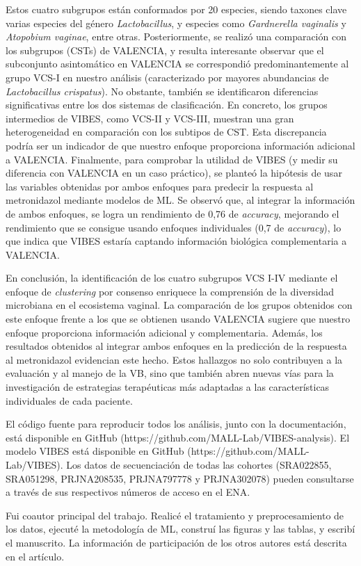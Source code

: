 Estos cuatro subgrupos están conformados por 20 especies, siendo taxones clave varias especies del género \textit{Lactobacillus}, y especies como \textit{Gardnerella vaginalis} y \textit{Atopobium vaginae}, entre otras. Posteriormente, se realizó una comparación con los subgrupos (CSTs) de VALENCIA, y resulta interesante observar que el subconjunto asintomático en VALENCIA se correspondió predominantemente al grupo VCS-I en nuestro análisis (caracterizado por mayores abundancias de \textit{Lactobacillus crispatus}). No obstante, también se identificaron diferencias significativas entre los dos sistemas de clasificación. En concreto, los grupos intermedios de VIBES, como VCS-II y VCS-III, muestran una gran heterogeneidad en comparación con los subtipos de CST. Esta discrepancia podría ser un indicador de que nuestro enfoque proporciona información adicional a VALENCIA. Finalmente, para comprobar la utilidad de VIBES (y medir su diferencia con VALENCIA en un caso práctico), se planteó la hipótesis de usar las variables obtenidas por ambos enfoques para predecir la respuesta al metronidazol mediante modelos de ML. Se observó que, al integrar la información de ambos enfoques, se logra un rendimiento de 0,76 de \textit{accuracy}, mejorando el rendimiento que se consigue usando enfoques individuales (0,7 de \textit{accuracy}), lo que indica que VIBES estaría captando información biológica complementaria a VALENCIA.


En conclusión, la identificación de los cuatro subgrupos VCS I-IV mediante el enfoque de \textit{clustering} por consenso enriquece la comprensión de la diversidad microbiana en el ecosistema vaginal. La comparación de los grupos obtenidos con este enfoque frente a los que se obtienen usando VALENCIA sugiere que nuestro enfoque proporciona información adicional y complementaria. Además, los resultados obtenidos al integrar ambos enfoques en la predicción de la respuesta al metronidazol evidencian este hecho. Estos hallazgos no solo contribuyen a la evaluación y al manejo de la VB, sino que también abren nuevas vías para la investigación de estrategias terapéuticas más adaptadas a las características individuales de cada paciente.

El código fuente para reproducir todos los análisis, junto con la documentación, está disponible en GitHub (https://github.com/MALL-Lab/VIBES-analysis). El modelo VIBES está disponible en GitHub (https://github.com/MALL-Lab/VIBES). Los datos de secuenciación de todas las cohortes (SRA022855, SRA051298, PRJNA208535, PRJNA797778 y PRJNA302078) pueden consultarse a través de sus respectivos números de acceso en el ENA.

Fui coautor principal del trabajo. Realicé el tratamiento y preprocesamiento de los datos, ejecuté la metodología de ML, construí las figuras y las tablas, y escribí el manuscrito. La información de participación de los otros autores está descrita en el artículo.

